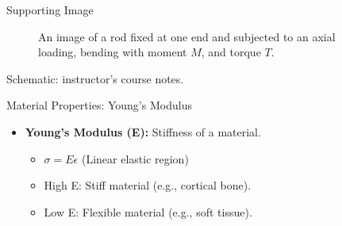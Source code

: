 \documentclass[aspectratio=169,11pt]{beamer}
\begin{document}
\begin{frame}{Supporting Image}
\begin{figure}
        \caption{An image of a rod fixed at one end and subjected to an axial loading, bending with moment $M$, and torque $T$.}
    \end{figure}
    \vspace{-3mm}
    {\centering\tiny\color{DarkGray}Schematic: instructor's course notes.\par}
\end{frame}

\begin{frame}{Material Properties: Young's Modulus}
  \begin{itemize}
    \item \textbf{Young's Modulus (E):} Stiffness of a material.
      \begin{itemize}
        \item $\sigma = E\epsilon$ (Linear elastic region)
        \item High E: Stiff material (e.g., cortical bone).
        \item Low E: Flexible material (e.g., soft tissue).
      \end{itemize}
  \end{itemize}
\end{frame}
\end{document}

